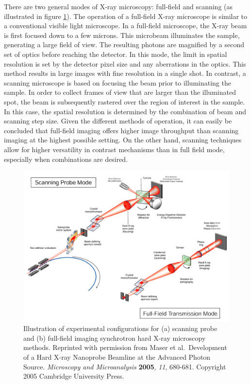 \documentclass[journal=cmatex,manuscript=perspective]{achemso}
\begin{document}
There are two general modes of X-ray microscopy: full-field and
scanning (as illustrated in figure \ref{figure:maser2005}). The
operation of a full-field X-ray microscope is similar to a
conventional visible light microscope. In a full-field microscope, the
X-ray beam is first focused down to a few microns. This microbeam
illuminates the sample, generating a large field of view. The
resulting photons are magnified by a second set of optics before
reaching the detector.  In this mode, the limit in spatial resolution
is set by the detector pixel size and any aberrations in the
optics. This method results in large images with fine resolution in a
single shot. In contrast, a scanning microscope is based on focusing
the beam prior to illuminating the sample.  In order to collect frames
of view that are larger than the illuminated spot, the beam is
subsequently rastered over the region of interest in the sample. In
this case, the spatial resolution is determined by the combination of
beam and scanning step size. Given the different methods of operation,
it can easily be concluded that full-field imaging offers higher image
throughput than scanning imaging at the highest possible setting. On
the other hand, scanning techniques allow for higher versatility in
contrast mechanisms than in full field mode, especially when
combinations are desired.

\begin{figure}
  \includegraphics[width=\textwidth]{maser2005.png}
  \caption{Illustration of experimental configurations for (a)
    scanning probe and (b) full-field imaging synchrotron hard X-ray
    microscopy methods. Reprinted with permission from Maser et
    al.\ Development of a Hard X-ray Nanoprobe Beamline at the Advanced
    Photon Source. \textit{Microscopy and Microanalysis}
    \textbf{2005}, \textit{11}, 680-681. Copyright 2005 Cambridge
    University Press.}
  \label{figure:maser2005}
\end{figure}
\end{document}
